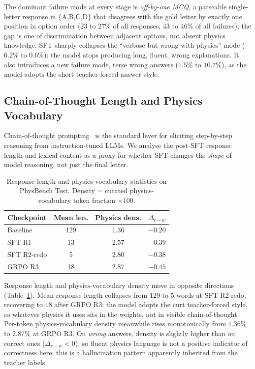 \documentclass{article}
\begin{document}
The dominant failure mode at every stage is \emph{off-by-one MCQ},
a parseable single-letter response in $\{$A,B,C,D$\}$ that
disagrees with the gold letter by exactly one position in option
order ($23$ to $27\%$ of all responses, $43$ to $46\%$ of all
failures); the gap is one of discrimination between adjacent
options, not absent physics knowledge. SFT sharply collapses the
``verbose-but-wrong-with-physics'' mode ($6.2\%$ to $0.6\%$): the
model stops producing long, fluent, wrong explanations. It also
introduces a new failure mode, terse wrong answers ($1.5\%$ to
$10.7\%$), as the model adopts the short teacher-forced answer
style.

\subsection{Chain-of-Thought Length and Physics Vocabulary}
\label{sec:cot}

Chain-of-thought prompting~\cite{cot2022} is the standard lever for
eliciting step-by-step reasoning from instruction-tuned LLMs. We
analyse the post-SFT response length and lexical content as a proxy
for whether SFT changes the \emph{shape} of model reasoning, not just
the final letter.

\begin{table}[t]
\caption{Response-length and physics-vocabulary statistics on
PhysBench Test. Density = curated physics-vocabulary token fraction
$\times 100$.}
\label{tab:cot}
\centering
\small
\begin{tabular}{lccc}
\toprule
Checkpoint & Mean len. & Physics dens. & $\Delta_{c-w}$ \\
\midrule
Baseline    & 129 & 1.36 & $-0.20$ \\
SFT R1      & 13  & 2.57 & $-0.39$ \\
SFT R2-redo & 5   & 2.80 & $-0.38$ \\
GRPO R3     & 18  & 2.87 & $-0.45$ \\
\bottomrule
\end{tabular}
\end{table}

Response length and physics-vocabulary density move in opposite
directions (Table~\ref{tab:cot}). Mean response length collapses
from $129$ to $5$ words at SFT R2-redo, recovering to $18$ after
GRPO R3: the model adopts the curt teacher-forced style, so
whatever physics it uses sits in the weights, not in visible
chain-of-thought. Per-token physics-vocabulary density meanwhile
rises monotonically from $1.36\%$ to $2.87\%$ at GRPO R3. On
\emph{wrong} answers, density is slightly higher than on correct
ones ($\Delta_{c-w}<0$), so fluent physics language is not a
positive indicator of correctness here; this is a hallucination
pattern apparently inherited from the teacher labels.
\end{document}
